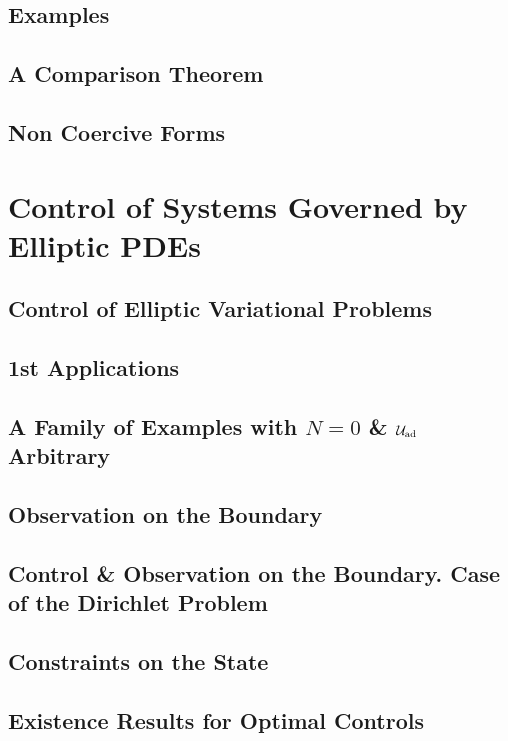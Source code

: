 \documentclass[oneside]{book}
\numberwithin{equation}{section}
\begin{document}
\subsection{Examples}

\subsection{A Comparison Theorem}

\subsection{Non Coercive Forms}

\section{Control of Systems Governed by Elliptic PDEs}

\subsection{Control of Elliptic Variational Problems}

\subsection{1st Applications}

\subsection{A Family of Examples with $N = 0$ \& $\mathcal{U}_{\rm ad}$ Arbitrary}

\subsection{Observation on the Boundary}

\subsection{Control \& Observation on the Boundary. Case of the Dirichlet Problem}

\subsection{Constraints on the State}

\subsection{Existence Results for Optimal Controls}
\end{document}
